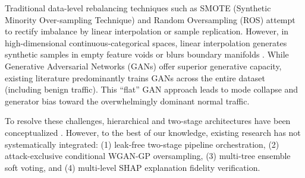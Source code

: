 \documentclass[journal]{IEEEtran}
\begin{document}
Traditional data-level rebalancing techniques such as SMOTE (Synthetic Minority Over-sampling Technique) \cite{chawla2002smote} and Random Oversampling (ROS) attempt to rectify imbalance by linear interpolation or sample replication. However, in high-dimensional continuous-categorical spaces, linear interpolation generates synthetic samples in empty feature voids or blurs boundary manifolds \cite{bedi2021isiamids}. While Generative Adversarial Networks (GANs) \cite{goodfellow2014generative, mirza2014conditional} offer superior generative capacity, existing literature predominantly trains GANs across the entire dataset (including benign traffic). This ``flat'' GAN approach leads to mode collapse and generator bias toward the overwhelmingly dominant normal traffic.

To resolve these challenges, hierarchical and two-stage architectures have been conceptualized \cite{tauscher2021twostage, zhang2023efficient, mahmoud2025xi2s}. However, to the best of our knowledge, existing research has not systematically integrated: (1) leak-free two-stage pipeline orchestration, (2) attack-exclusive conditional WGAN-GP oversampling, (3) multi-tree ensemble soft voting, and (4) multi-level SHAP explanation fidelity verification.
\end{document}
